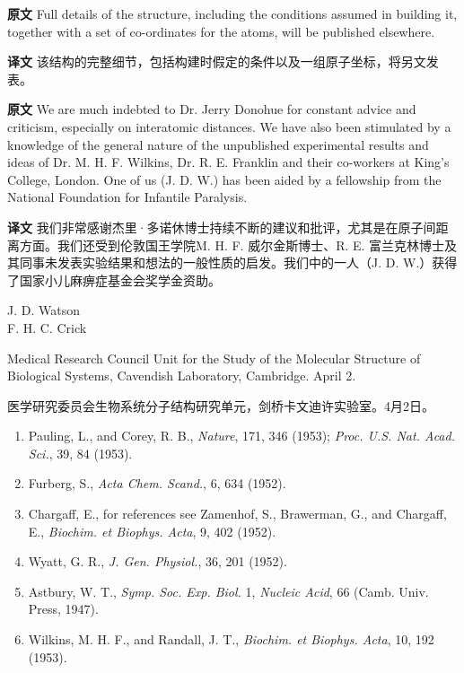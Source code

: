 \documentclass[UTF8,zihao=-4]{ctexart}
\newcommand{\BodyFont}{\fontsize{10.5pt}{15.5pt}\selectfont}
\renewenvironment{quote}{\par\noindent\begingroup\BodyFont}{\par\endgroup}
\begin{document}
\begin{quote}
\noindent\textbf{原文} Full details of the structure, including the conditions assumed in building it, together with a set of co-ordinates for the atoms, will be published elsewhere.

\smallskip
\noindent\textbf{译文} 该结构的完整细节，包括构建时假定的条件以及一组原子坐标，将另文发表。
\end{quote}

\begin{quote}
\noindent\textbf{原文} We are much indebted to Dr. Jerry Donohue for constant advice and criticism, especially on interatomic distances. We have also been stimulated by a knowledge of the general nature of the unpublished experimental results and ideas of Dr. M. H. F. Wilkins, Dr. R. E. Franklin and their co-workers at King's College, London. One of us (J. D. W.) has been aided by a fellowship from the National Foundation for Infantile Paralysis.

\smallskip
\noindent\textbf{译文} 我们非常感谢杰里·多诺休博士持续不断的建议和批评，尤其是在原子间距离方面。我们还受到伦敦国王学院M. H. F. 威尔金斯博士、R. E. 富兰克林博士及其同事未发表实验结果和想法的一般性质的启发。我们中的一人（J. D. W.）获得了国家小儿麻痹症基金会奖学金资助。
\end{quote}

\begin{flushright}
J. D. Watson\\
F. H. C. Crick
\end{flushright}

\begin{quote}
\noindent Medical Research Council Unit for the Study of the Molecular Structure of Biological Systems, Cavendish Laboratory, Cambridge. April 2.

\smallskip
\noindent 医学研究委员会生物系统分子结构研究单元，剑桥卡文迪许实验室。4月2日。
\end{quote}

\begin{enumerate}
\item Pauling, L., and Corey, R. B., \emph{Nature}, 171, 346 (1953); \emph{Proc. U.S. Nat. Acad. Sci.}, 39, 84 (1953).
\item Furberg, S., \emph{Acta Chem. Scand.}, 6, 634 (1952).
\item Chargaff, E., for references see Zamenhof, S., Brawerman, G., and Chargaff, E., \emph{Biochim. et Biophys. Acta}, 9, 402 (1952).
\item Wyatt, G. R., \emph{J. Gen. Physiol.}, 36, 201 (1952).
\item Astbury, W. T., \emph{Symp. Soc. Exp. Biol.} 1, \emph{Nucleic Acid}, 66 (Camb. Univ. Press, 1947).
\item Wilkins, M. H. F., and Randall, J. T., \emph{Biochim. et Biophys. Acta}, 10, 192 (1953).
\end{enumerate}
\end{document}
